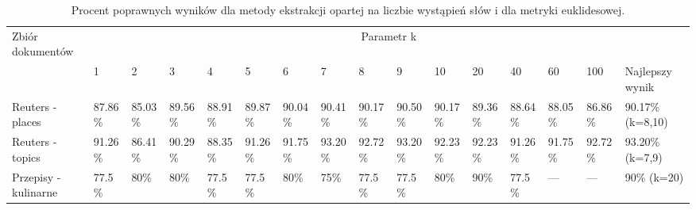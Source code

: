 \documentclass{classrep}
\begin{document}
\begingroup
{\scriptsize  
\setlength{\LTleft}{-20cm plus -1fill}
\setlength{\LTright}{\LTleft}

\begin{longtable}{|p{1cm}|p{0.7cm}|p{0.7cm}|p{0.7cm}|p{0.7cm}|p{0.7cm}|p{0.7cm}|p{0.7cm}|p{0.7cm}|p{0.7cm}|p{0.7cm}|p{0.7cm}|p{0.7cm}|p{0.7cm}|p{0.7cm}|p{1.1cm}|}
\caption{ Procent poprawnych wyników dla metody ekstrakcji opartej na liczbie wystąpień słów i dla metryki euklidesowej.}\\ 
\hline

Zbiór
dokumentów

 &\multicolumn{15}{c|}{Parametr k}\\
\cline{2-16}
& 1
& 2
& 3
& 4
& 5
& 6
& 7
& 8
& 9
& 10
& 20
& 40
& 60
& 100
& Najlepszy wynik
\\ \hline\hline
Reuters
- places
& 87.86\%	%
& 85.03\%	%
& 89.56\%	%
& 88.91\%	%
& 89.87\%	%
& 90.04\%	%
& 90.41\%	%
& 90.17\%	%
& 90.50\%	%
& 90.17\%	%
& 89.36\%	%
& 88.64\%	%
& 88.05\%	%
& 86.86\%	%
& 90.17\% (k=8,10)
\\ \hline
Reuters
- topics
& 91.26\%	%
& 86.41\%	%
& 90.29\%	%
& 88.35\%	%
& 91.26\%	%
& 91.75\%	%
& 93.20\%	%
& 92.72\%	%
& 93.20\%	%
& 92.23\%	%
& 92.23\%	%
& 91.26\%	%
& 91.75\%	%
& 92.72\%	%
& 93.20\% (k=7,9)
\\ \hline
Przepisy
- kulinarne 
& 77.5\%	%
& 80\%		%
& 80\%		%
& 77.5\%	%
& 77.5\%	%
& 80\%		%
& 75\%		%
& 77.5\%	%
& 77.5\%	%
& 80\%		%
& 90\%		%
& 77.5\%	%
& ---		%
& ---		%
& 90\% (k=20)
\\ \hline
\end{longtable}
}
\endgroup


\end{document}
